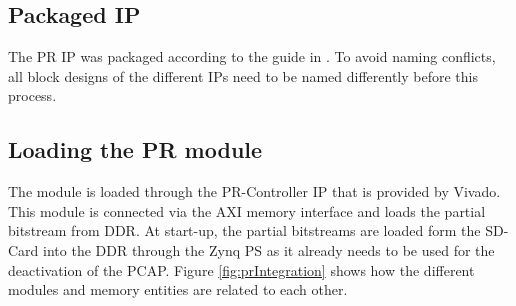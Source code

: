 \subsection{Packaged IP}
The \gls{PR} IP was packaged according to the guide in \cite{xilinx_ug1118-vivado-creating-packaging-custom-ip.pdf_nodate}.
To avoid naming conflicts, all block designs of the different IPs need to be named differently before this process.
\subsection{Loading the \gls{PR} module}
The module is loaded through the \gls{PR}-Controller IP that is provided by Vivado. 
This module is connected via the AXI memory interface and loads the partial bitstream from DDR.
At start-up, the partial bitstreams are loaded form the SD-Card into the DDR through the Zynq \gls{PS} as it already needs to be used for the deactivation of the \gls{PCAP}.
Figure \ref{fig:prIntegration} shows how the different modules and memory entities are related to each other.